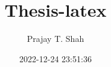 \documentclass{uwthesis}%
\title{Thesis{-}latex}%
\author{Prajay T. Shah}%
\date{2022{-}12{-}24 23:51:36}%
\begin{document}
%
\normalsize%
\maketitle%
\end{document}
